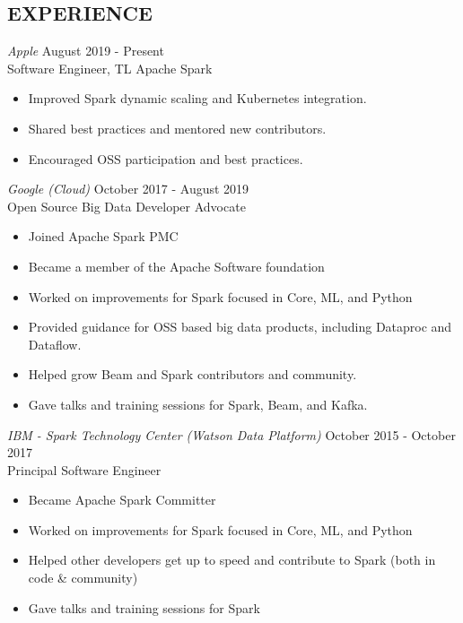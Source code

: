\documentclass[10pt,line,margin=0.1]{newsres}
\begin{document}
\begin{resume}
\section{EXPERIENCE}
        {\sl Apple} \hfill August 2019 - Present\\
        Software Engineer, TL Apache Spark
        \begin{itemize}  \itemsep -2pt %
          \item Improved Spark dynamic scaling and Kubernetes integration.
          \item Shared best practices and mentored new contributors.
          \item Encouraged OSS participation and best practices.
        \end{itemize}                
        {\sl Google (Cloud)} \hfill October 2017 - August 2019\\
        Open Source Big Data Developer Advocate
        \begin{itemize}  \itemsep -2pt %
          \item Joined Apache Spark PMC
          \item Became a member of the Apache Software foundation
          \item Worked on improvements for Spark focused in Core, ML, and Python
          \item Provided guidance for OSS based big data products, including Dataproc and Dataflow.
          \item Helped grow Beam and Spark contributors and community.
          \item Gave talks and training sessions for Spark, Beam, and Kafka.
        \end{itemize}
            {\sl IBM - Spark Technology Center (Watson Data Platform)} \hfill October 2015 - October 2017\\
        Principal Software Engineer
        \begin{itemize}  \itemsep -2pt %
          \item Became Apache Spark Committer
          \item Worked on improvements for Spark focused in Core, ML, and Python
          \item Helped other developers get up to speed and contribute to Spark (both in code \& community)
          \item Gave talks and training sessions for Spark
        \end{itemize}

\end{resume}
\end{document}

